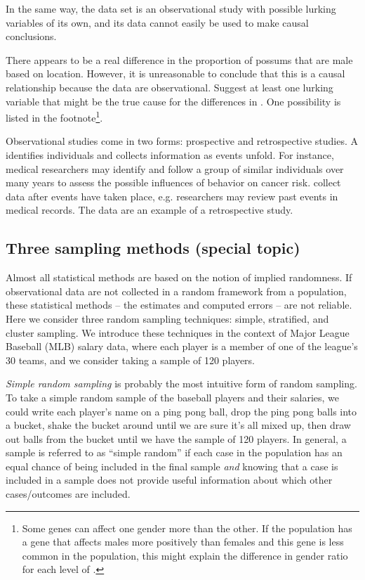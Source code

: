 In the same way, the  data set is an observational study with possible lurking variables of its own, and its data cannot easily be used to make causal conclusions.

\begin{exercise}
There appears to be a real difference in the proportion of possums that are male based on location. However, it is unreasonable to conclude that this is a causal relationship because the data are observational. Suggest at least one lurking variable that might be the true cause for the differences in . One possibility is listed in the footnote\footnote{Some genes can affect one gender more than the other. If the  population has a gene that affects males more positively than females and this gene is less common in the  population, this might explain the difference in gender ratio for each level of .}.
\end{exercise}

Observational studies come in two forms: prospective and retrospective studies. A  identifies individuals and collects information as events unfold. For instance, medical researchers may identify and follow a group of similar individuals over many years to assess the possible influences of behavior on cancer risk.  collect data after events have taken place, e.g. researchers may review past events in medical records. The  data are an example of a retrospective study.

\subsection{Three sampling methods (special topic)}
\label{threeSamplingMethods}

Almost all statistical methods are based on the notion of implied randomness. If observational data are not collected in a random framework from a population, these statistical methods -- the estimates and computed errors -- are not reliable. Here we consider three random sampling techniques: simple, stratified, and cluster sampling. We introduce these techniques in the context of Major League Baseball (MLB) salary data, where each player is a member of one of the league's 30 teams, and we consider taking a sample of 120 players.

\emph{Simple random sampling} is probably the most intuitive form of random sampling. To take a simple random sample of the baseball players and their salaries, we could write each player's name on a ping pong ball, drop the ping pong balls into a bucket, shake the bucket around until we are sure it's all mixed up, then draw out balls from the bucket until we have the sample of 120 players. In general, a sample is referred to as ``simple random'' if each case in the population has an equal chance of being included in the final sample \emph{and} knowing that a case is included in a sample does not provide useful information about which other cases/outcomes are included.


